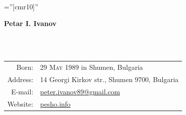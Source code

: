 \documentclass[a4paper,10pt]{article}
\def\name{Petar I. Ivanov}
\newcommand{\minorcolor}[1]{\textcolor{mygray}{#1}}
\begin{document}
\pagestyle{empty}				%
\font\fb=''[cmr10]''				%

\begin{figure}
	\setlength\fboxsep{0pt}
	\setlength\fboxrule{0.1pt}
        \vspace{-20pt}
\end{figure}

\par{\raggedright\Huge\textbf{\vspace{-3mm}\hspace{0mm}\name}}\\		%
\vspace{-5mm}{\color{linegray}\rule{10.5cm}{0.1mm}}\\

\hspace{4mm}\begin{tabular}{rl}
	\minorcolor{Born:} & \textsc{29 May 1989} in Shumen, Bulgaria\\
	\minorcolor{Address:} & \textsc{14} Georgi Kirkov str., Shumen \textsc{9700}, Bulgaria\\
	\minorcolor{E-mail:} & \href{mailto:peter.ivanov89@gmail.com}{peter.ivanov89@gmail.com}\\
	\minorcolor{Website:} & \href{http://pesho.info}{pesho.info}\\
\end{tabular}
\bigskip

\end{document}
